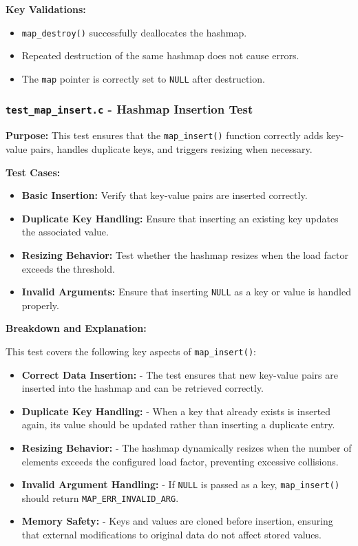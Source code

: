 \documentclass[titlepage]{article}
\begin{document}
\textbf{Key Validations:}
\begin{itemize}
    \item \texttt{map\_destroy()} successfully deallocates the hashmap.
    \item Repeated destruction of the same hashmap does not cause errors.
    \item The \texttt{map} pointer is correctly set to \texttt{NULL} after destruction.
\end{itemize}


\subsubsection{\texttt{test\_map\_insert.c} - Hashmap Insertion Test}

\textbf{Purpose:}
This test ensures that the \texttt{map\_insert()} function correctly adds key-value pairs, handles duplicate keys, and triggers resizing when necessary.

\textbf{Test Cases:}
\begin{itemize}
    \item \textbf{Basic Insertion:} Verify that key-value pairs are inserted correctly.
    \item \textbf{Duplicate Key Handling:} Ensure that inserting an existing key updates the associated value.
    \item \textbf{Resizing Behavior:} Test whether the hashmap resizes when the load factor exceeds the threshold.
    \item \textbf{Invalid Arguments:} Ensure that inserting \texttt{NULL} as a key or value is handled properly.
\end{itemize}

\textbf{Breakdown and Explanation:}

This test covers the following key aspects of \texttt{map\_insert()}:

\begin{itemize}
    \item \textbf{Correct Data Insertion:}
    - The test ensures that new key-value pairs are inserted into the hashmap and can be retrieved correctly.

    \item \textbf{Duplicate Key Handling:}
    - When a key that already exists is inserted again, its value should be updated rather than inserting a duplicate entry.

    \item \textbf{Resizing Behavior:}
    - The hashmap dynamically resizes when the number of elements exceeds the configured load factor, preventing excessive collisions.

    \item \textbf{Invalid Argument Handling:}
    - If \texttt{NULL} is passed as a key, \texttt{map\_insert()} should return \texttt{MAP\_ERR\_INVALID\_ARG}.

    \item \textbf{Memory Safety:}
    - Keys and values are cloned before insertion, ensuring that external modifications to original data do not affect stored values.
\end{itemize}
\end{document}
